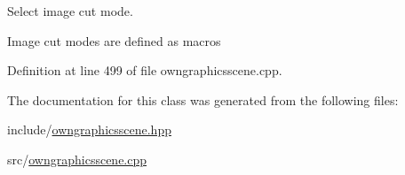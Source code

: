 Select image cut mode. 

Image cut modes are defined as macros 

Definition at line 499 of file owngraphicsscene.\+cpp.



The documentation for this class was generated from the following files\+:\begin{DoxyCompactItemize}
\item 
include/\mbox{\hyperlink{owngraphicsscene_8hpp}{owngraphicsscene.\+hpp}}\item 
src/\mbox{\hyperlink{owngraphicsscene_8cpp}{owngraphicsscene.\+cpp}}\end{DoxyCompactItemize}
